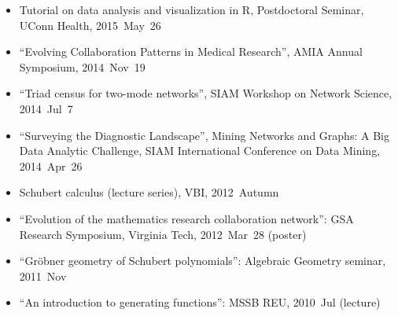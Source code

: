 \documentclass[10pt,a4paper]{article}
\begin{document}
\begin{itemize}[label=$\circ$,nolistsep]
\item
Tutorial on data analysis and visualization in R, Postdoctoral Seminar, UConn Health, 2015~May~26
\item
``Evolving Collaboration Patterns in Medical Research'', AMIA Annual Symposium, 2014~Nov~19
\item
``Triad census for two-mode networks'', SIAM Workshop on Network Science, 2014~Jul~7
\item
``Surveying the Diagnostic Landscape'', Mining Networks and Graphs: A Big Data Analytic Challenge, SIAM International Conference on Data Mining, 2014~Apr~26
\item
Schubert calculus (lecture series), VBI, 2012~Autumn
\item
``Evolution of the mathematics research collaboration network'': GSA Research Symposium, Virginia Tech, 2012~Mar~28 (poster)
\item
``Gr\"obner geometry of Schubert polynomials'': Algebraic Geometry seminar, 2011~Nov
\item
``An introduction to generating functions'': MSSB REU, 2010~Jul (lecture)

\end{itemize}
\end{document}
